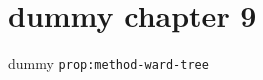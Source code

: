 \clearpage\begingroup\small
\setcounter{chapter}{9}\addtocounter{chapter}{-1}
\chapter{dummy chapter 9}
\begin{proposition}\label{prop:method-ward-tree}dummy \texttt{prop:method-ward-tree}\end{proposition}
\endgroup

